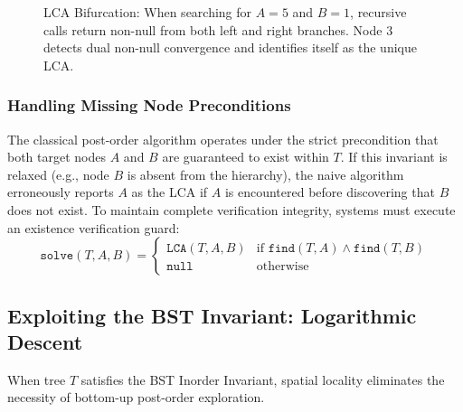\documentclass[10pt,twocolumn,letterpaper]{article}
\begin{document}
\begin{figure}[htbp]
\centering
{}
\caption{LCA Bifurcation: When searching for $A=5$ and $B=1$, recursive calls return non-null from both left and right branches. Node 3 detects dual non-null convergence and identifies itself as the unique LCA.}
\label{fig:lca-tree}
\end{figure}

\subsubsection{Handling Missing Node Preconditions}
The classical post-order algorithm operates under the strict precondition that both target nodes $A$ and $B$ are guaranteed to exist within $T$. If this invariant is relaxed (e.g., node $B$ is absent from the hierarchy), the naive algorithm erroneously reports $A$ as the LCA if $A$ is encountered before discovering that $B$ does not exist.
To maintain complete verification integrity, systems must execute an existence verification guard:
\[
\texttt{solve}(T, A, B) = 
\begin{cases} 
\texttt{LCA}(T, A, B) & \text{if } \texttt{find}(T, A) \land \texttt{find}(T, B) \\
\texttt{null} & \text{otherwise}
\end{cases}
\]

\subsection{Exploiting the BST Invariant: Logarithmic Descent}

When tree $T$ satisfies the BST Inorder Invariant, spatial locality eliminates the necessity of bottom-up post-order exploration.
\end{document}
